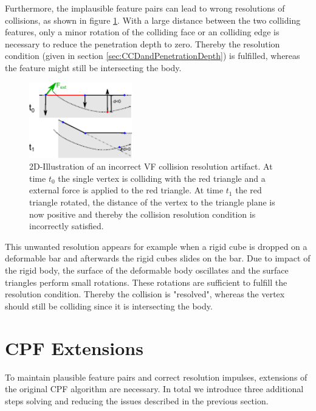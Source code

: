 Furthermore, the implausible feature pairs can lead to wrong resolutions of collisions, as shown in figure \ref{fig:slidingVertexSmallRotation}. With a large distance between the two colliding features, only a minor rotation of the colliding face or an colliding edge is necessary to reduce the penetration depth to zero. Thereby the resolution condition (given in section \ref{sec:CCDandPenetrationDepth}) is fulfilled, whereas the feature might still be intersecting the body.
\begin{figure}[h] 
  \centering
     \includegraphics[width=0.4\textwidth]{pics/pdf/slidingVertexSmallRotation.pdf}
  \caption[2D-Illustration of an incorrect VF collision resolution artifact]{2D-Illustration of an incorrect VF collision resolution artifact. At time $t_0$ the single vertex is colliding with the red triangle and a external force is applied to the red triangle. At time $t_1$ the red triangle rotated, the distance of the vertex to the triangle plane is now positive and thereby the collision resolution condition is incorrectly satisfied.}
  \label{fig:slidingVertexSmallRotation}
\end{figure}
This unwanted resolution appears for example when a rigid cube is dropped on a deformable bar and afterwards the rigid cubes slides on the bar. Due to impact of the rigid body, the surface of the deformable body oscillates and the surface triangles perform small rotations. These rotations are sufficient to fulfill the resolution condition. Thereby the collision is "resolved", whereas the vertex should still be colliding since it is intersecting the body.


\section{CPF Extensions}
\label{sec::CPFExtensions}
To maintain plausible feature pairs and correct resolution impulses, extensions of the original CPF algorithm are necessary.
In total we introduce three additional steps solving and reducing the issues described in the previous section. %


